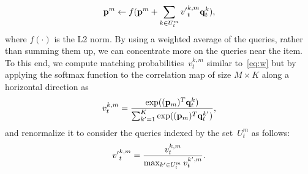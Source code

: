 \documentclass[10pt,twocolumn,letterpaper]{article}
\begin{document}
\begin{equation}\label{eq:update}
\vspace{-0.15cm}
\mathbf{p}^m \leftarrow f(\mathbf{p}^m + \sum_{k\in U_t^m} {v'}_t^{k,m} \mathbf{q}_t^k),
\vspace{-0.1cm}
\end{equation}
 where $f(\cdot)$ is the L2 norm. By using a weighted average of the queries, rather than summing them up, we can concentrate more on the queries near the item. To this end, we compute matching probabilities~$v_t^{k, m}$ similar to~\eqref{eq:w} but by applying the softmax function to the correlation map of size $M \times K$ along a horizontal direction as 
			\begin{equation}\label{eq:v}
\vspace{-0.15cm}
				v_t^{k,m} = \frac{\exp((\mathbf{p}_m)^T\mathbf{q}_t^k)}{\sum_{k'=1}^K \exp((\mathbf{p}_m)^T\mathbf{q}_t^{k'})},
			\end{equation}
and renormalize it to consider the queries indexed by the set~$U_t^m$ as follows:
			\begin{equation}
\vspace{-0.15cm}
				{v'}_t^{k,m}=\frac{v_t^{k, m}}{\max_{k'\in U_t^m} v_t^{k', m}}.
\vspace{-0.1cm}
			\end{equation}
\end{document}
